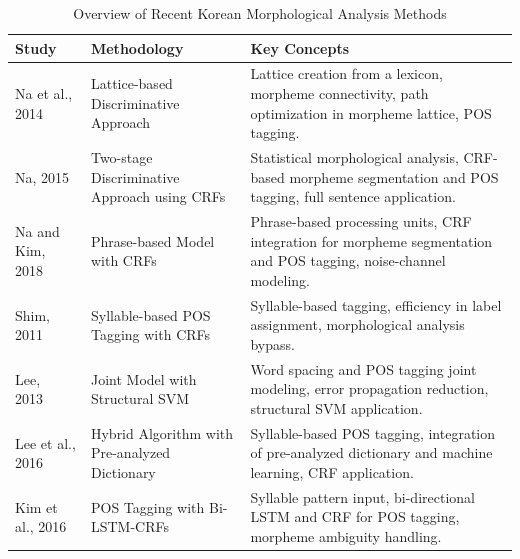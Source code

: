 \documentclass[AMS,STIX2COL]{WileyNJD-v2}
\begin{document}
    \begin{table}[ht]
        \centering
        \footnotesize %
        \caption{Overview of Recent Korean Morphological Analysis Methods}
        \label{tab:overview-of-recent-korean-morphological-analysis-methods}
        \begin{tabular}{|p{10mm}|p{24mm}|p{40mm}|}
            \hline
            \textbf{Study}                        & \textbf{Methodology}                                   & \textbf{Key Concepts}                                                                                             \\
            \hline
            Na et al., 2014~\cite{NaSH2014}       & Lattice-based Discriminative Approach                  & Lattice creation from a lexicon, morpheme connectivity, path optimization in morpheme lattice, POS tagging.       \\
            \hline
            Na, 2015~\cite{NaSH2015}              & Two-stage Discriminative Approach using CRFs           & Statistical morphological analysis, CRF-based morpheme segmentation and POS tagging, full sentence application.   \\
            \hline
            Na and Kim, 2018~\cite{NaSH2018}      & Phrase-based Model with CRFs                           & Phrase-based processing units, CRF integration for morpheme segmentation and POS tagging, noise-channel modeling. \\
            \hline
            Shim, 2011~\cite{ShimKS2011}          & Syllable-based POS Tagging with CRFs                   & Syllable-based tagging, efficiency in label assignment, morphological analysis bypass.                            \\
            \hline
            Lee, 2013~\cite{LeeCK2013}            & Joint Model with Structural SVM                        & Word spacing and POS tagging joint modeling, error propagation reduction, structural SVM application.             \\
            \hline
            Lee et al., 2016~\cite{LeeCH2016}     & Hybrid Algorithm with Pre-analyzed Dictionary          & Syllable-based POS tagging, integration of pre-analyzed dictionary and machine learning, CRF application.         \\
            \hline
            Kim et al., 2016~\cite{KimHM2016}     & POS Tagging with Bi-LSTM-CRFs                          & Syllable pattern input, bi-directional LSTM and CRF for POS tagging, morpheme ambiguity handling.                 \\

\end{tabular}
\end{table}
\end{document}
